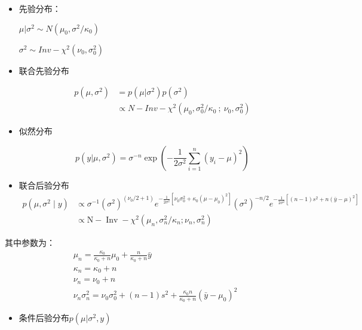 \begin{itemize}
\item
  先验分布：

  \(\mu|\sigma^2 \sim N(\mu_0,\sigma^2/\kappa_0)\)

  \(\sigma^2 \sim Inv-\chi^2(\nu_0,\sigma^2_0)\)
\item
  联合先验分布

  \begin{align*}
  p(\mu,\sigma^2)
  &=p(\mu|\sigma^2)p(\sigma^2)\\
  &\propto N-Inv-\chi^2(\mu_0,\sigma^2_0/\kappa_0\ ;\ \nu_0,\sigma^2_0 )
  \end{align*}
\item
  似然分布

  \[p(y|\mu,\sigma^2)=\sigma^{-n}\exp \left(
  -\frac{1}{2\sigma^2}\sum_{i=1}^{n}(y_i-\mu)^2
  \right)\]
\item
  联合后验分布
\begin{equation}
  \begin{aligned}
    p\left(\mu, \sigma^{2} \mid y\right) 
    & \propto \sigma^{-1}\left(\sigma^{2}\right)^{\left(\nu_{0} / 2+1\right)} e^{-\frac{1}{2 \sigma^{2}}\left[\nu_{0} \sigma_{0}^{2}+\kappa_{0}\left(\mu-\mu_{0}\right)^{2}\right]}
    \left(\sigma^{2}\right)^{-n / 2} e^{-\frac{1}{2 \sigma^{2}}\left[(n-1) s^{2}+n(\bar{y}-\mu)^{2}\right]} \\
    & \propto \mathrm{N}-\operatorname{Inv}-\chi^{2}\left(\mu_{n}, \sigma_{n}^{2} / \kappa_{n} ; \nu_{n}, \sigma_{n}^{2}\right)
  \end{aligned}
\end{equation}


\end{itemize}

其中参数为：
\begin{equation}
  \begin{array}{c}
    \mu_{n}   = \frac{\kappa_{0}}{\kappa_{0}+n} \mu_{0}+\frac{n}{\kappa_{0}+n} \bar{y}\\
    \kappa_{n}= \kappa_{0}+n \\
    \nu_{n}   = \nu_{0}+n \\
    \nu_{n} \sigma_{n}^{2}=\nu_{0} \sigma_{0}^{2}+(n-1) s^{2}+\frac{\kappa_{0} n}{\kappa_{0}+n}\left(\bar{y}-\mu_{0}\right)^{2}
    \end{array}
\end{equation}


\begin{itemize}
\item
  条件后验分布\(p(\mu|\sigma^2,y)\)
\end{itemize}

